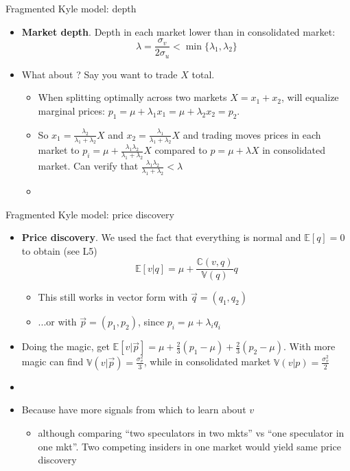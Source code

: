 \documentclass[english,10pt
,aspectratio=169
]{beamer}
\begin{document}
\begin{frame}{Fragmented Kyle model: depth}
	\begin{itemize}
		\item \textbf{Market depth}. \alert{Depth in each market lower than in consolidated market}:
		\[
		\lambda = \frac{\sigma_v}{2 \sigma_u} < \min \{ \lambda_1, \lambda_2 \}
		\]
		
		\pause
		\item What about ? Say you want to trade $X$ total.
		\begin{itemize}
			\item When splitting optimally across two markets $X=x_1+x_2$, will equalize marginal prices: $p_1 = \mu + \lambda_1 x_1 = \mu + \lambda_2 x_2 = p_2$.
			\item So $x_1 = \frac{\lambda_2}{\lambda_1+\lambda_2} X$ and $x_2 = \frac{\lambda_1}{\lambda_1+\lambda_2} X$ and trading moves prices in each market to $p_i = \mu + \frac{\lambda_1 \lambda_2}{\lambda_1 + \lambda_2} X$ compared to $p = \mu + \lambda X$ in consolidated market. Can verify that $\frac{\lambda_1 \lambda_2}{\lambda_1 + \lambda_2} < \lambda$
			\item {}
		\end{itemize}
	\end{itemize}
\end{frame}


\begin{frame}{Fragmented Kyle model: price discovery}
	\begin{itemize}
		\item \textbf{Price discovery}. We used the fact that everything is normal and $\mathbb{E}[q]=0$ to obtain (see L5)
		$$
			\mathbb{E}[v|q] = \mu +\frac{\mathbb{C}(v,q)}{\mathbb{V}(q)} q
		$$
		\begin{itemize}
			\item This still works in vector form with $\vec{q}=(q_1,q_2)$
			\item ...or with $\vec{p}=(p_1,p_2)$, since $p_i = \mu + \lambda_i q_i$
		\end{itemize}
		\pause
		\item Doing the magic, get $\mathbb{E}[v|\vec{p}] = \mu + \frac{2}{3}(p_1 - \mu) + \frac{2}{3}(p_2 - \mu)$. With more magic can find $\mathbb{V}(v|\vec{p}) = \frac{\sigma^2_v}{3}$, while in consolidated market $\mathbb{V}(v|p) = \frac{\sigma^2_v}{2}$
		\item {}
		\item Because have more signals from which to learn about $v$ 
		\pause 
		\begin{itemize}
			\item although comparing ``two speculators in two mkts'' vs ``one speculator in one mkt''. Two competing insiders in one market would yield \alert{same price discovery}
		\end{itemize}
	\end{itemize}
\end{frame}
\end{document}
